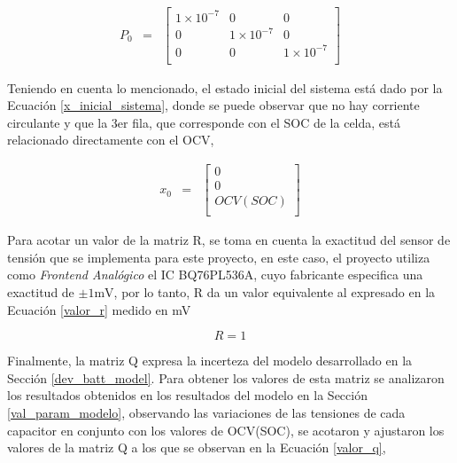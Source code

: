 \documentclass[10pt,a4paper]{article}
\begin{document}
\begin{equation}
    \begin{array}{llll}
	P_0 & = & \begin{bmatrix}
        1\times10^{-7}  & 0              & 0 \\
        0               & 1\times10^{-7} & 0 \\
        0               & 0              & 1\times10^{-7} \\
	\end{bmatrix} 
    \end{array}
    \label{p_inicial}
\end{equation}

Teniendo en cuenta lo mencionado, el estado inicial del sistema est\'a dado por
la Ecuaci\'on \ref{x_inicial_sistema}, donde se puede observar que no hay
corriente circulante y que la 3er fila, que corresponde con el \acrshort{SOC} de
la celda, est\'a relacionado directamente con el \acrshort{OCV},

\begin{equation}
    \begin{array}{llll}
	x_0 & = & \begin{bmatrix}
	    0 \\
	    0 \\
        OCV(SOC) \\
	\end{bmatrix} 
    \end{array} \label{x_inicial_sistema}
\end{equation}

Para acotar un valor de la matriz R, se toma en cuenta la exactitud del sensor
de tensi\'on que se implementa para este proyecto, en este caso, el proyecto
utiliza como \emph{Frontend Anal\'ogico} el \acrshort{IC} BQ76PL536A, cuyo
fabricante especifica una exactitud de $\mathrm{\pm 1mV}$, por lo tanto, R da un 
valor equivalente al expresado en la Ecuaci\'on \ref{valor_r} medido en mV

\begin{equation}
    R = 1  \label{valor_r}
\end{equation}

Finalmente, la matriz Q expresa la incerteza del modelo desarrollado en la 
Secci\'on \ref{dev_batt_model}. Para obtener los valores de esta matriz se
analizaron los resultados obtenidos en los resultados del modelo en la Secci\'on 
\ref{val_param_modelo}, observando las variaciones de las tensiones de cada
capacitor en conjunto con los valores de \acrshort{OCV}(SOC), se acotaron y
ajustaron los valores de la matriz Q a los que se observan en la Ecuaci\'on
\ref{valor_q},
\end{document}
